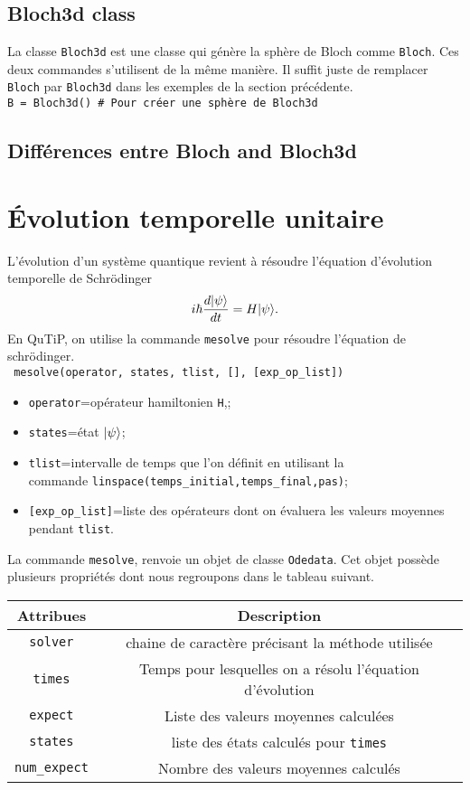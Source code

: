 \subsection{Bloch3d class}

La classe \texttt{Bloch3d} est une classe qui génère la sphère de Bloch comme \texttt{Bloch}. Ces deux commandes s'utilisent de la même manière. Il suffit juste de remplacer \texttt{Bloch} par \texttt{Bloch3d} dans les exemples de la section précédente.\\
\texttt{B = Bloch3d() \# Pour créer une sphère de Bloch3d}

\subsection{Différences entre Bloch and Bloch3d}


\section{Évolution temporelle unitaire}
L'évolution d'un système quantique revient à résoudre l'équation d'évolution temporelle de Schr\"odinger
\begin{equation}
i\hbar\dfrac{d\vert\psi\rangle}{dt}=H\vert\psi\rangle.
\end{equation}
En QuTiP, on utilise la commande \texttt{mesolve} pour résoudre l'équation de schr\"odinger.\\
\texttt{ mesolve(operator, states, tlist, [], [exp\_op\_list])}
\begin{itemize}
\item \texttt{operator}=opérateur hamiltonien \texttt{H},;
\item \texttt{states}=état $\vert\psi\rangle$;
\item \texttt{tlist}=intervalle de temps que l'on définit en utilisant la\\
commande \texttt{linspace(temps\_initial,temps\_final,pas)};
\item \texttt{[exp\_op\_list]}=liste des opérateurs dont on évaluera les valeurs
moyennes pendant \texttt{tlist}.
\end{itemize}
La commande \texttt{mesolve}, renvoie un objet de classe \texttt{Odedata}. Cet objet possède plusieurs propriétés dont nous regroupons dans le tableau suivant.
\begin{center}
\begin{tabular}{|c|c|} \hline \hline
\textbf{Attribues} & \textbf{Description} \\ \hline \hline
\texttt{solver} & chaine de caractère précisant la méthode utilisée \\ \hline
\texttt{times} & Temps pour lesquelles on a résolu l'équation d'évolution\\ \hline
\texttt{expect} & Liste des valeurs moyennes calculées\\ \hline
\texttt{states} & liste des états calculés pour \texttt{times}\\ \hline
\texttt{num\_expect} & Nombre des valeurs moyennes calculés\\ \hline
\end{tabular}
\end{center}

